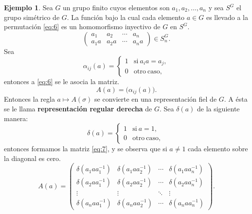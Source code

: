 \documentclass[12pt]{book}
\theoremstyle{definition}
\newtheorem{example}[theorem]{Ejemplo}
\newcounter{in}
\newcounter{ini}
\begin{document}
\begin{example}
  \label{Ej4}
  Sea $G$ un grupo finito cuyos elementos son $a_{1},a_{2},...,a_{n}$
  y sea $S^{G}$ el grupo simétrico de $G$. La función bajo la cual
  cada elemento $a \in G$ es llevado a la permutación \ref{eq:6} es un
  homomorfismo inyectivo de $G$ en $S^{G}$.
  \begin{equation}
    \label{eq:6}
    \begin{pmatrix}
      a_{1} & a_{2} & \cdots  & a_{n}\\
      a_{1}a & a_{2}a & \cdots & a_{n}a
    \end{pmatrix} 
    \in S_{n}^{G}.
  \end{equation}
  Sea
  \begin{equation*}
    \alpha_{ij} (a) = \left\{
      \begin{array}{ll}
        1      & \mathrm{si\ } a_{i}a = a_{j}, \\
        0      & \mathrm{otro\ caso,\ }
      \end{array}
    \right. 
  \end{equation*}
  entonces a \ref{eq:6} se le asocia la matriz. 
  \begin{equation*}
    A(a)=\big(\alpha_{ij}(a)\big).
  \end{equation*} 
  Entonces la regla $a \mapsto A\left(\sigma\right)$ se convierte en
  una representación fiel de $G$. A ésta se le llama \textbf{representación
  regular derecha} de $G$. Sea $\delta{(a)}$ de la siguiente manera:
  \begin{equation*}
    \delta{(a)} = \left\{
      \begin{array}{ll}
        1      & \mathrm{si\ } a = 1, \\
        0      & \mathrm{otro\ caso,\ } 
      \end{array}
    \right.
  \end{equation*}
  entonces formamos la matriz \ref{eq:7}, y se observa que si
  $a \neq 1$ cada elemento sobre la diagonal es cero.
  \begin{equation}
    \label{eq:7}
    A\left(a\right) = 
    \begin{pmatrix}
      \delta\left(a_{1}aa_{1}^{-1}\right) & \delta\left(a_{1}aa_{2}^{-1}\right) & \cdots  & \delta\left(a_{1}aa_{n}^{-1}\right)\\
      \delta\left(a_{2}aa_{1}^{-1}\right) & \delta\left(a_{2}aa_{2}^{-1}\right) & \cdots  & \delta\left(a_{2}aa_{n}^{-1}\right)\\ 
      \vdots & \vdots & \ddots & \vdots\\
      \delta\left(a_{n}aa_{1}^{-1}\right) & \delta\left(a_{n}aa_{2}^{-1}\right) & \cdots  & \delta\left(a_{n}aa_{n}^{-1}\right)
    \end{pmatrix}
    .
  \end{equation}


\end{example}
\end{document}
